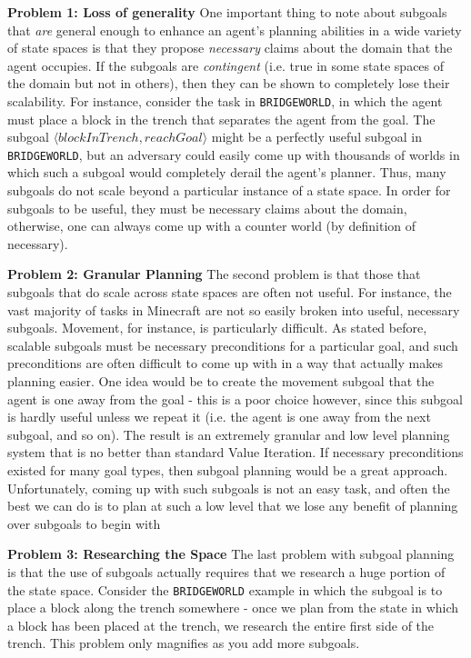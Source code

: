 \documentclass[]{article}
\begin{document}
{\bf Problem 1: Loss of generality}  One important thing to note about subgoals that {\it are} general enough to enhance an agent's planning abilities in a wide variety of state spaces is that they propose {\it necessary} claims about the domain that the agent occupies. If the subgoals are {\it contingent} (i.e. true in some state spaces of the domain but not in others), then they can be shown to completely lose their scalability. For instance, consider the task in \texttt{BRIDGEWORLD}, in which the agent must place a block in the trench that separates the agent from the goal. The subgoal $\langle blockInTrench, reachGoal\rangle$ might be a perfectly useful subgoal in \texttt{BRIDGEWORLD}, but an adversary could easily come up with thousands of worlds in which such a subgoal would completely derail the agent's planner. Thus, many subgoals do not scale beyond a particular instance of a state space. In order for subgoals to be useful, they must be necessary claims about the domain, otherwise, one can always come up with a counter world (by definition of necessary). 

{\bf Problem 2: Granular Planning} The second problem is that those that subgoals that do scale across state spaces are often not useful. For instance, the vast majority of tasks in Minecraft are not so easily broken into useful, necessary subgoals. Movement, for instance, is particularly difficult. As stated before, scalable subgoals must be necessary preconditions for a particular goal, and such preconditions are often difficult to come up with in a way that actually makes planning easier. One idea would be to create the movement subgoal that the agent is one away from the goal - this is a poor choice however, since this subgoal is hardly useful unless we repeat it (i.e. the agent is one away from the next subgoal, and so on). The result is an extremely granular and low level planning system that is no better than standard Value Iteration. If necessary preconditions existed for many goal types, then subgoal planning would be a great approach. Unfortunately, coming up with such subgoals is not an easy task, and often the best we can do is to plan at such a low level that we lose any benefit of planning over subgoals to begin with


{\bf Problem 3: Researching the Space} The last problem with subgoal planning is that the use of subgoals actually requires that we research a huge portion of the state space. Consider the \texttt{BRIDGEWORLD} example in which the subgoal is to place a block along the trench somewhere - once we plan from the state in which a block has been placed at the trench, we research the entire first side of the trench. This problem only magnifies as you add more subgoals.
\end{document}
